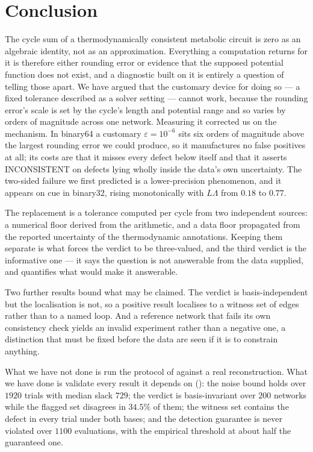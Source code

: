 \documentclass[11pt,twocolumn,a4paper]{article}
\theoremstyle{pstyle}
\theoremstyle{definition}
\theoremstyle{remark}
\newcommand{\eps}{\varepsilon}
\begin{document}
\section{Conclusion}
\label{sec:conclusion}

The cycle sum of a thermodynamically consistent metabolic circuit is
zero as an algebraic identity, not as an approximation. Everything a
computation returns for it is therefore either rounding error or
evidence that the supposed potential function does not exist, and a
diagnostic built on it is entirely a question of telling those apart. We
have argued that the customary device for doing so --- a fixed tolerance
described as a solver setting --- cannot work, because the rounding
error's scale is set by the cycle's length and potential range and so
varies by orders of magnitude across one network. Measuring it corrected
us on the mechanism. In binary64 a customary $\eps=10^{-6}$ sits six
orders of magnitude above the largest rounding error we could produce,
so it manufactures no false positives at all; its costs are that it
misses every defect below itself and that it asserts
\textsf{INCONSISTENT} on defects lying wholly inside the data's own
uncertainty. The two-sided failure we first predicted is a
lower-precision phenomenon, and it appears on cue in binary32, rising
monotonically with $L\Lambda$ from $0.18$ to $0.77$.

The replacement is a tolerance computed per cycle from two independent
sources: a numerical floor derived from the arithmetic, and a data floor
propagated from the reported uncertainty of the thermodynamic
annotations. Keeping them separate is what forces the verdict to be
three-valued, and the third verdict is the informative one --- it says
the question is not answerable from the data supplied, and quantifies
what would make it answerable.

Two further results bound what may be claimed. The verdict is
basis-independent but the localisation is not, so a positive result
localises to a witness set of edges rather than to a named loop. And a
reference network that fails its own consistency check yields an invalid
experiment rather than a negative one, a distinction that must be fixed
before the data are seen if it is to constrain anything.

What we have not done is run the protocol of  against
a real reconstruction. What we have done is validate every result it
depends on (): the noise bound holds over $1920$
trials with median slack $729$; the verdict is basis-invariant over
$200$ networks while the flagged set disagrees in $34.5\%$ of them; the
witness set contains the defect in every trial under both bases; and the
detection guarantee is never violated over $1100$ evaluations, with the
empirical threshold at about half the guaranteed one.
\end{document}
